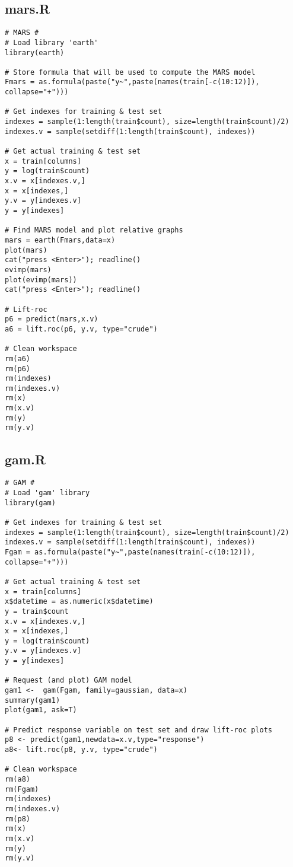 \subsection{mars.R}\label{sec:mars-script}
\begin{verbatim}
# MARS #
# Load library 'earth'
library(earth)

# Store formula that will be used to compute the MARS model
Fmars = as.formula(paste("y~",paste(names(train[-c(10:12)]), collapse="+")))

# Get indexes for training & test set
indexes = sample(1:length(train$count), size=length(train$count)/2)
indexes.v = sample(setdiff(1:length(train$count), indexes))

# Get actual training & test set
x = train[columns]
y = log(train$count)
x.v = x[indexes.v,]
x = x[indexes,]
y.v = y[indexes.v]
y = y[indexes]

# Find MARS model and plot relative graphs
mars = earth(Fmars,data=x)
plot(mars)
cat("press <Enter>"); readline()
evimp(mars)
plot(evimp(mars))
cat("press <Enter>"); readline()

# Lift-roc
p6 = predict(mars,x.v)
a6 = lift.roc(p6, y.v, type="crude")

# Clean workspace
rm(a6)
rm(p6)
rm(indexes)
rm(indexes.v)
rm(x)
rm(x.v)
rm(y)
rm(y.v)
\end{verbatim}

\subsection{gam.R}\label{sec:gam-script}
\begin{verbatim}
# GAM #
# Load 'gam' library
library(gam)

# Get indexes for training & test set
indexes = sample(1:length(train$count), size=length(train$count)/2)
indexes.v = sample(setdiff(1:length(train$count), indexes))
Fgam = as.formula(paste("y~",paste(names(train[-c(10:12)]), collapse="+")))

# Get actual training & test set
x = train[columns]
x$datetime = as.numeric(x$datetime)
y = train$count
x.v = x[indexes.v,]
x = x[indexes,]
y = log(train$count)
y.v = y[indexes.v]
y = y[indexes]

# Request (and plot) GAM model
gam1 <-  gam(Fgam, family=gaussian, data=x)
summary(gam1)
plot(gam1, ask=T)

# Predict response variable on test set and draw lift-roc plots
p8 <- predict(gam1,newdata=x.v,type="response")
a8<- lift.roc(p8, y.v, type="crude")

# Clean workspace
rm(a8)
rm(Fgam)
rm(indexes)
rm(indexes.v)
rm(p8)
rm(x)
rm(x.v)
rm(y)
rm(y.v)
\end{verbatim}

